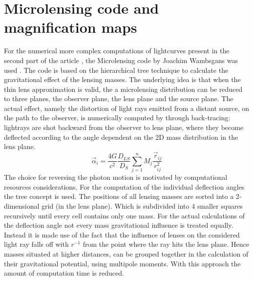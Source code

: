 \section{Microlensing code and magnification maps}
For the numerical more complex computations of lightcurves present in the second part of the article , the Microlensing code by Joachim Wambsgans was used \cite{1999A&A...346L...5W}. The code is based on the hierarchical tree technique to calculate the gravitational effect of the lensing masses. The underlying idea is that when the thin lens approximation is valid, the a microlensing distribution can be reduced to three planes, the observer plane, the lens plane and the source plane. The actual effect, namely the distortion of light rays emitted from a distant source, on the path to the observer, is numerically computed by through back-tracing: lightrays are shot backward from the observer to lens plane, where they become deflected according to the angle dependent on the 2D mass distribution in the lens plane.
\begin{equation}
\vec{\alpha}_{i}=\frac{4G}{c^{2}} \frac{D_{LS}}{D_{S}}\sum_{j=1}^{n}M_j \frac{\vec{r}_{ij}}{r^2_{ij}} 
\end{equation}  
The choice for reversing the photon motion is motivated by computational resources considerations. 
For the computation of the individual deflection angles the tree concept is used. The positions of all lensing masses are sorted into a 2-dimensional grid (in the lens plane). Which is subdivided into 4 smaller squares recursively until every cell contains only one mass. For the actual calculations of the deflection angle not every mass gravitational influence is treated equally. Instead it is made use of the fact that the influence of lenses on the considered light ray falls off with $r^{-1}$ from the point where the ray hits the lens plane. Hence masses situated at higher distances, can be grouped together in the calculation of their gravitational potential, using multipole moments. With this approach the amount of computation time is reduced. \\


